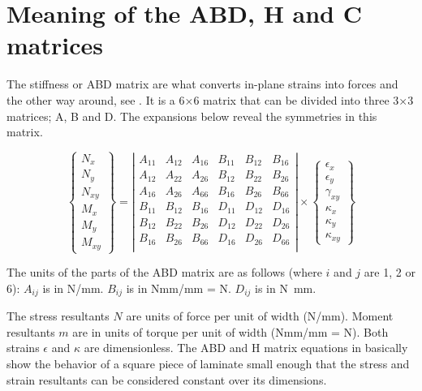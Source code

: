 \documentclass[a4paper,landscape,oneside,11pt,twocolumn]{memoir}
\begin{document}
\section{Meaning of the ABD, H and C matrices} %

The stiffness or ABD matrix are what converts
in-plane strains into forces and the other way around, see
.  It is a 6×6 matrix that can be divided
into three 3×3 matrices; A, B and D.
The expansions below reveal the symmetries in this matrix.

\[
  \left\{\begin{array}{c}
          N_x\\ N_y\\ N_{xy}\\ M_x\\ M_y\\ M_{xy}
        \end{array}\right\} =
    \left|\begin{array}{cccccc}
        A_{11} & A_{12} & A_{16} & B_{11} & B_{12} & B_{16}\\
        A_{12} & A_{22} & A_{26} & B_{12} & B_{22} & B_{26}\\
        A_{16} & A_{26} & A_{66} & B_{16} & B_{26} & B_{66}\\
        B_{11} & B_{12} & B_{16} & D_{11} & D_{12} & D_{16}\\
        B_{12} & B_{22} & B_{26} & D_{12} & D_{22} & D_{26}\\
        B_{16} & B_{26} & B_{66} & D_{16} & D_{26} & D_{66}\\
    \end{array}\right|
    \times
        \left\{\begin{array}{c}
            \epsilon_x\\[2pt] \epsilon_y\\[2pt] \gamma_{xy}\\[2pt]
            \kappa_x\\[2pt] \kappa_y\\[2pt] \kappa_{xy}
          \end{array}\right\}
\]

The units of the parts of the ABD matrix are as follows (where $i$ and
$j$ are 1, 2 or 6): $A_{ij}$ is in \si{N/mm}. $B_{ij}$ is in \si{Nmm/mm}
= \si{N}.  $D_{ij}$ is in \si{N.mm}.

The stress resultants $N$ are units of force per unit of width (\si{N/mm}).
Moment resultants $m$ are in units of torque per unit of width (\si{Nmm/mm}
= \si{N}). Both strains $\epsilon$ and $\kappa$ are dimensionless.
The ABD and H matrix equations in  basically show the
behavior of a square piece of laminate small enough that the stress and strain
resultants can be considered constant over its dimensions.
\end{document}
